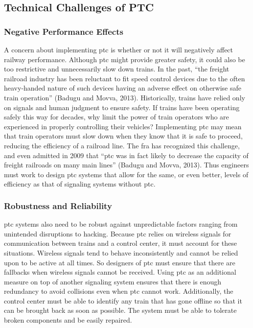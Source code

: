 \documentclass[11pt, titlepage]{article}
\begin{document}
\subsection{Technical Challenges of PTC}

\subsubsection{Negative Performance Effects}

A concern about implementing \gls{ptc} is whether or not it will negatively affect
railway performance. Although \gls{ptc} might provide greater safety, it could also
be too restrictive and unnecessarily slow down trains. In the past, ``the freight
railroad industry has been reluctant to fit speed control devices due to the often
heavy-handed nature of such devices having an adverse effect on otherwise safe
train operation'' (Badugu and Movva, 2013). Historically, trains have relied only on signals
and human judgment to ensure safety. If trains have been operating safely this way
for decades, why limit the power of train operators who are experienced in properly
controlling their vehicles? Implementing \gls{ptc} may mean that train operators
must slow down when they know that it is safe to proceed, reducing the efficiency
of a railroad line. The \gls{fra} has recognized this challenge, and even admitted
in 2009 that ``\gls{ptc} was in fact likely to decrease the capacity of freight
railroads on many main lines'' (Badugu and Movva, 2013). Thus engineers must work to design
\gls{ptc} systems that allow for the same, or even better, levels of efficiency as
that of signaling systems without \gls{ptc}.

\subsubsection{Robustness and Reliability}

\gls{ptc} systems also need to be robust against unpredictable factors ranging from
unintended disruptions to hacking. Because \gls{ptc} relies on wireless signals for
communication between trains and a control center, it must account for these
situations. Wireless signals tend to behave inconsistently and cannot be relied
upon to be active at all times. So designers of \gls{ptc} must ensure that there
are fallbacks when wireless signals cannot be received. Using \gls{ptc} as an
additional measure on top of another signaling system ensures that there is enough
redundancy to avoid collisions even when \gls{ptc} cannot work. Additionally, the
control center must be able to identify any train that has gone offline so that it
can be brought back as soon as possible. The system must be able to tolerate broken
components and be easily repaired.
\end{document}
